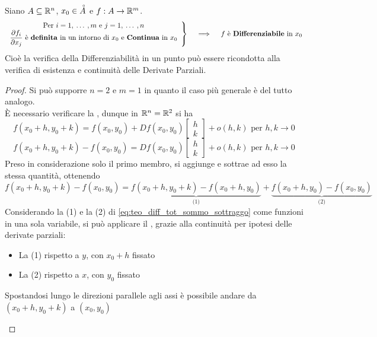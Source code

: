 \begin{theorem}
	\label{teo:diff_tot}
	Siano $A \subseteq \mathbb{R}^n$, $x_0 \in \accentset{\circ}{A}$ e $f:A \to \mathbb{R}^m$.
	\[
		\left.
			\begin{array}{c}
				\text{Per } i = 1,\:\dotsc\:,m \text{ e } j = 1,\:\dotsc\:,n\\
				\dfrac{\partial f_i}{\partial x_j} \text{ è \textbf{definita} in un intorno di } x_0 \text{ e  \textbf{Continua} in } x_0
			\end{array}
		\right\}
		\quad \implies \quad
		f \text{ è \textbf{Differenziabile} in } x_0
	\]
	Cioè la verifica della Differenziabilità in un punto può essere ricondotta alla verifica di esistenza e continuità delle Derivate Parziali.
	\begin{proof}
		Si può supporre $n = 2$ e $m = 1$ in quanto il caso più generale è del tutto analogo.\\
		È necessario verificare la , dunque in $\mathbb{R}^n = \mathbb{R}^2$ si ha
		\begin{equation}
			\label{eq:deriv_tot_def_diff}
			f(x_0 + h, y_0 + k) = f(x_0, y_0) + Df(x_0, y_0) \begin{bmatrix}h\\k\end{bmatrix} + o(h,k) \text{ per } h,k \to 0
		\end{equation}
		\[f(x_0 + h, y_0 + k) - f(x_0, y_0) = Df(x_0, y_0) \begin{bmatrix}h\\k\end{bmatrix} + o(h,k) \text{ per } h,k \to 0\]
		Preso in considerazione solo il primo membro, si aggiunge e sottrae ad esso la stessa quantità, ottenendo
		\begin{equation}
			\label{eq:teo_diff_tot_sommo_sottraggo}
			f(x_0 + h, y_0 + k) - f(x_0, y_0) = \underbrace{f(x_0 + h, y_0 + k) - f(x_0+h,y_0)}_{\text{(1)}} + \underbrace{f(x_0+h,y_0) - f(x_0, y_0)}_{\text{(2)}}
		\end{equation}
		Considerando la (1) e la (2) di \cref{eq:teo_diff_tot_sommo_sottraggo} come funzioni in una sola variabile, si può applicare il , grazie alla continuità per ipotesi delle derivate parziali:
		\begin{itemize}
			\item La (1) rispetto a $y$, con $x_0 + h$ fissato
			\item La (2) rispetto a $x$, con $y_0$ fissato
		\end{itemize}
		Spostandosi lungo le direzioni parallele agli assi è possibile andare da $(x_0 + h, y_0 + k)$ a $(x_0, y_0)$
		\begin{center}
\end{center}
\end{proof}
\end{theorem}
